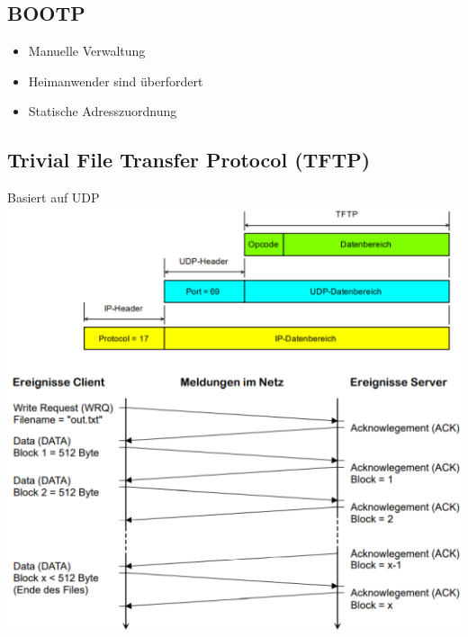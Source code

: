{  \subsection{BOOTP}{
      \begin{itemize}[noitemsep]
          \item Manuelle Verwaltung
          \item Heimanwender sind überfordert
          \item Statische Adresszuordnung
      \end{itemize}

  }
 

  \subsection{Trivial File Transfer Protocol (TFTP)}{
      {Basiert auf UDP}\\
      \includegraphics[scale=.2]{img/tftp.png} }


 }